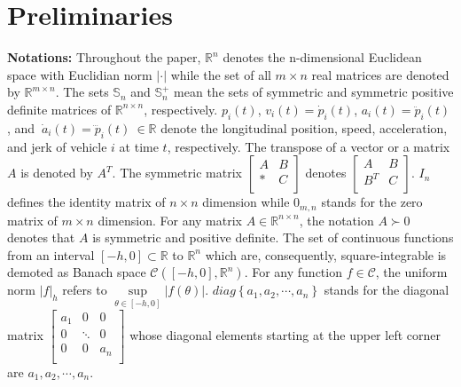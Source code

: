 \documentclass[journal]{IEEEtran}
\begin{document}


\section{Preliminaries}
\label{Section 2}


\textbf{Notations:} Throughout the paper, $\mathbb{R}^n$ denotes the n-dimensional Euclidean space with Euclidian norm $|\cdot|$ while the set of all $m\times n$ real matrices are denoted by $\mathbb{R}^{m\times n}$. The sets $\mathbb{S}_n$ and $\mathbb{S}_n^+$ mean the sets of symmetric and symmetric positive definite matrices of $\mathbb{R}^{n\times n}$, respectively. $p_i\left(t\right)$, $v_i\left(t\right)={\dot{p}}_i\left(t\right)$, $a_i\left(t\right)={\ddot{p}}_i\left(t\right)$, and $\ {\dot{a}}_i\left(t\right)={\dddot{p}}_i\left(t\right)\ \in\mathbb{R}$ denote the longitudinal position, speed, acceleration, and jerk of vehicle $i$ at time $t$, respectively. The transpose of a vector or a matrix $A$ is denoted by $A^T$. The symmetric matrix $\left[\begin{matrix}A&B\\\ast&C\\\end{matrix}\right]$ denotes $\left[\begin{matrix}A&B\\B^T&C\\\end{matrix}\right]$. $I_n$ defines the identity matrix of $n\times n$ dimension while $0_{m,n}$ stands for the zero matrix of $m\times n$ dimension. For any matrix $A\in\mathbb{R}^{n\times n}$, the notation $A\succ0$ denotes that $A$ is symmetric and positive definite. The set of continuous functions from an interval $\left[ { - h,0} \right] \subset \mathbb{R}$ to ${\mathbb{R}^n}$ which are, consequently, square-integrable is demoted as Banach space $\mathcal{C} \left(\left[-h,0\right],\mathbb{R}^n\right)$. For any function $f\in\mathcal{C}$, the uniform norm $|f|_h$ refers to $\mathop {\sup }\limits_{\theta  \in [ - h,0]} |f(\theta )|$. $diag\left\{a_1,a_2,\cdots,a_n\right\}$ stands for the diagonal matrix $\left[\begin{matrix}a_1&0&0\\0&\ddots&0\\0&0&a_n\\\end{matrix}\right]$ whose diagonal elements starting at the upper left corner are $a_1,a_2,\cdots,a_n$.
\end{document}
